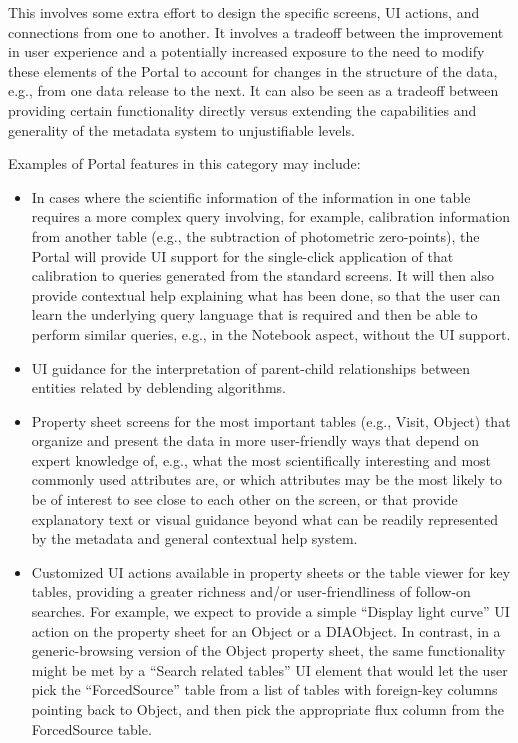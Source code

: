 This involves some extra effort to design the specific screens, UI actions, and connections from one to another.
It involves a tradeoff between the improvement in user experience and a potentially increased exposure to the need to modify these elements of the Portal to account for changes in the structure of the data, e.g., from one data release to the next.
It can also be seen as a tradeoff between providing certain functionality directly versus extending the capabilities and generality of the metadata system to unjustifiable levels.

Examples of Portal features in this category may include:

\begin{itemize}
\item In cases where the scientific information of the information in one table requires a more complex query involving, for example, calibration information from another table (e.g., the subtraction of photometric zero-points), the Portal will provide UI support for the single-click application of that calibration to queries generated from the standard screens.
It will then also provide contextual help explaining what has been done, so that the user can learn the underlying query language that is required and then be able to perform similar queries, e.g., in the Notebook aspect, without the UI support.
\item UI guidance for the interpretation of parent-child relationships between entities related by deblending algorithms.
\item Property sheet screens for the most important tables (e.g., Visit, Object) that organize and present the data in more user-friendly ways that depend on expert knowledge of, e.g., what the most scientifically interesting and most commonly used attributes are, or which attributes may be the most likely to be of interest to see close to each other on the screen, or that provide explanatory text or visual guidance beyond what can be readily represented by the metadata and general contextual help system.
\item Customized UI actions available in property sheets or the table viewer for key tables, providing a greater richness and/or user-friendliness of follow-on searches.
For example, we expect to provide a simple ``Display light curve'' UI action on the property sheet for an Object or a DIAObject.
In contrast, in a generic-browsing version of the Object property sheet, the same functionality might be met by a ``Search related tables'' UI element that would let the user pick the ``ForcedSource'' table from a list of tables with foreign-key columns pointing back to Object, and then pick the appropriate flux column from the ForcedSource table.

\end{itemize}
